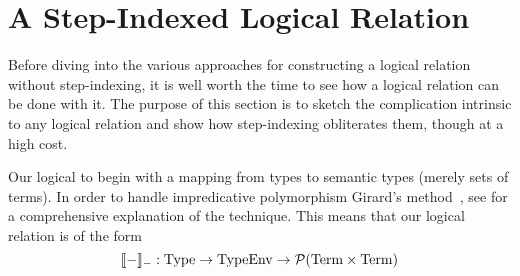 \section{A Step-Indexed Logical Relation}

Before diving into the various approaches for constructing a logical
relation without step-indexing, it is well worth the time to see how
a logical relation can be done with it. The purpose of this section is
to sketch the complication intrinsic to any logical relation and show
how step-indexing obliterates them, though at a high cost.

Our logical to begin with a mapping from types to semantic types
(merely sets of terms). In order to handle impredicative polymorphism
Girard's method~\citep{Girard:71,Girard:72}, see \citet{TODO-PFPL} for
a comprehensive explanation of the technique. This means that our
logical relation is of the form
\[
  \llbracket - \rrbracket_{-} : \mathrm{Type} \to \mathrm{TypeEnv} \to \mathcal{P}(\mathrm{Term} \times \mathrm{Term})
\]


